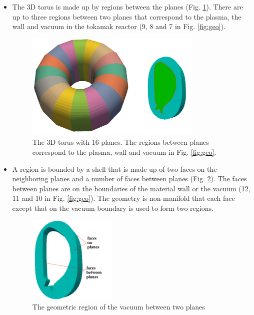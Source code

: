 \documentclass[11pt]{article}  %
\begin{document}
\begin{itemize}
\item The 3D torus is made up by regions between the planes (Fig. \ref{fig:3dtopo}). There are up to three regions between two planes that correspond to the  plasma, the wall and vacuum in the tokamak reactor (9, 8 and 7 in Fig. \ref{fig:geo}). 
\begin{figure}[htb]
\center
\includegraphics[width=0.8\textwidth]{fig/3dGeoTorus.png}
\caption{The 3D torus with 16 planes. The regions between planes correspond to the plasma, wall and vacuum in Fig. \ref{fig:geo}.} \label{fig:3dtopo}
\end{figure}

\item A region is bounded by a shell that is made up of two faces on the neighboring planes and a number of faces between planes (Fig. \ref{fig:regiontopo}). The faces between planes are on the boundaries of the material wall or the vacuum (12, 11 and 10 in Fig. \ref{fig:geo}). The geometry is non-manifold \cite{weiler1986topo} that each face except that on the vacuum boundary is used to form two regions. 
\begin{figure}[htb]
\center
\includegraphics[width=0.4\textwidth]{fig/vacuumGeoRegionFace.png}
\caption{The geometric region of the vacuum between two planes} \label{fig:regiontopo}
\end{figure}


\end{itemize}
\end{document}
